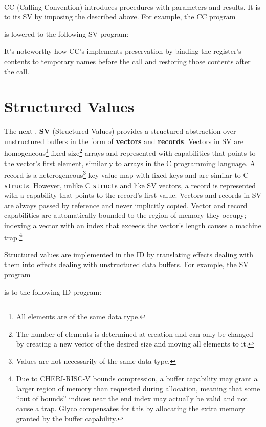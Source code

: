 \documentclass[main.tex]{subfiles}
\begin{document}
\hspace{0pt} \\
CC (Calling Convention) introduces procedures with parameters and results. It is \lowered{} to its  SV by imposing the  described above. For example, the CC program

is lowered to the following SV program:


It's noteworthy how CC's  implements  preservation by binding the register's contents to temporary names before the call and restoring those contents after the call. %

\section{Structured Values}
The next , \textbf{SV} (Structured Values) provides a structured abstraction over unstructured buffers in the form of \textbf{vectors} and \textbf{records}. Vectors in SV are homogeneous\footnote{All elements are of the same data type.} fixed-size\footnote{The number of elements is determined at creation and can only be changed by creating a new vector of the desired size and moving all elements to it.} arrays and represented with capabilities that points to the vector's first element, similarly to arrays in the C programming language. A record is a heterogeneous\footnote{Values are not necessarily of the same data type.} key-value map with fixed keys and are similar to C \texttt{struct}s. However, unlike C \texttt{struct}s and like SV vectors, a record is represented with a capability that points to the record's first value. Vectors and records in SV are always passed by reference and never implicitly copied. Vector and record capabilities are automatically bounded to the region of memory they occupy; indexing a vector with an index that exceeds the vector's length causes a machine trap.\footnote{Due to CHERI-RISC-V bounds compression, a buffer capability may grant a larger region of memory than requested during allocation, meaning that some \enquote{out of bounds} indices near the end index may actually be valid and not cause a trap. Glyco compensates for this by allocating the extra memory granted by the buffer capability.}

Structured values are implemented in the  ID by translating effects dealing with them into effects dealing with unstructured data buffers. For example, the SV program

is \lowered{} to the following ID program:

\end{document}
